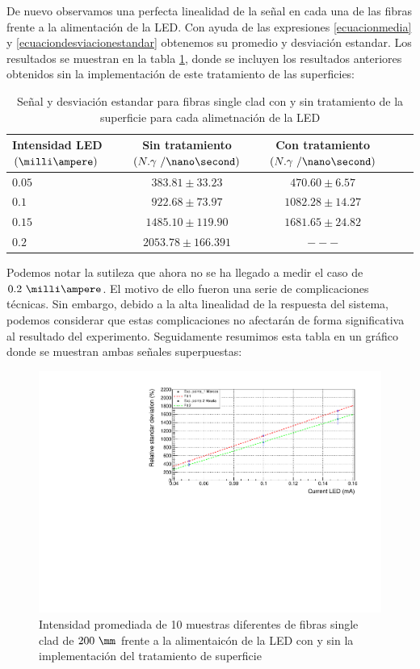 De nuevo observamos una perfecta linealidad de la señal en cada una de las fibras frente a la alimentación de la LED. Con ayuda de las expresiones \ref{ecuacionmedia} y \ref{ecuaciondesviacionestandar} obtenemos su promedio y desviación estandar. Los resultados se muestran en la tabla \ref{singlecladlimpieza}, donde se incluyen los resultados anteriores obtenidos sin la implementación de este tratamiento de las superficies:

\begin{table}[H]
\begin{center}
\begin{tabular}{l | c | c | c | c }
Intensidad LED $(\milli\ampere)$ &  Sin tratamiento $(N.\gamma~/\nano\second)$ & Con tratamiento $(N.\gamma~/\nano\second)$ \\
\hline \hline
$0.05$ & $383.81 \pm 33.23$ & $470.60 \pm 6.57$\\ 
$0.1$ & $922.68 \pm 73.97$ & $1082.28 \pm 14.27$\\
$0.15$ & $1485.10 \pm 119.90$ & $1681.65 \pm 24.82$\\
$0.2$ & $2053.78 \pm 166.391$ & $ --- $\\

\end{tabular}
\caption{Señal y desviación estandar para fibras single clad con y sin tratamiento de la superficie para cada alimetnación de la LED\label{singlecladlimpieza}}
\end{center}
\end{table}

Podemos notar la sutileza que ahora no se ha llegado a medir el caso de $0.2~\milli\ampere$. El motivo de ello fueron una serie de complicaciones técnicas. Sin embargo, debido a la alta linealidad de la respuesta del sistema, podemos considerar que estas complicaciones no afectarán de forma significativa al resultado del experimento. Seguidamente resumimos esta tabla en un gráfico donde se muestran ambas señales superpuestas: 

\begin{figure}[hbtp]
\centering
\includegraphics[scale=0.7]{Figuras/comparacion.pdf}
\caption{Intensidad promediada de 10 muestras diferentes de fibras single clad de $200~\mm$ frente a la alimentaicón de la LED con y sin la implementación del tratamiento de superficie\label{promediosinglecladlimpieza}}
\end{figure}

